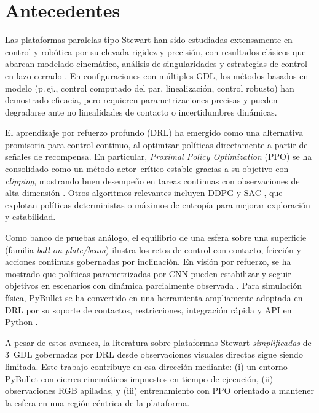 \documentclass[conference]{IEEEtran}
\begin{document}
\section{Antecedentes}
Las plataformas paralelas tipo Stewart han sido estudiadas extensamente en control y robótica por su elevada rigidez y precisión, con resultados clásicos que abarcan modelado cinemático, análisis de singularidades y estrategias de control en lazo cerrado \cite{Stewart1965,Merlet2006}. En configuraciones con múltiples GDL, los métodos basados en modelo (p.\,ej., control computado del par, linealización, control robusto) han demostrado eficacia, pero requieren parametrizaciones precisas y pueden degradarse ante no linealidades de contacto o incertidumbres dinámicas.

El aprendizaje por refuerzo profundo (DRL) ha emergido como una alternativa promisoria para control continuo, al optimizar políticas directamente a partir de señales de recompensa. En particular, \emph{Proximal Policy Optimization} (PPO) se ha consolidado como un método actor–crítico estable gracias a su objetivo con \emph{clipping}, mostrando buen desempeño en tareas continuas con observaciones de alta dimensión \cite{Schulman2017PPO}. Otros algoritmos relevantes incluyen DDPG \cite{Lillicrap2016DDPG} y SAC \cite{Haarnoja2018SAC}, que explotan políticas deterministas o máximos de entropía para mejorar exploración y estabilidad.

Como banco de pruebas análogo, el equilibrio de una esfera sobre una superficie (familia \emph{ball-on-plate/beam}) ilustra los retos de control con contacto, fricción y acciones continuas gobernadas por inclinación. En visión por refuerzo, se ha mostrado que políticas parametrizadas por CNN pueden estabilizar y seguir objetivos en escenarios con dinámica parcialmente observada \cite{Levine2016EndToEnd}. Para simulación física, PyBullet se ha convertido en una herramienta ampliamente adoptada en DRL por su soporte de contactos, restricciones, integración rápida y API en Python \cite{Coumans2016PyBullet}.

A pesar de estos avances, la literatura sobre plataformas Stewart \emph{simplificadas} de 3~GDL gobernadas por DRL desde observaciones visuales directas sigue siendo limitada. Este trabajo contribuye en esa dirección mediante: (i) un entorno PyBullet con cierres cinemáticos impuestos en tiempo de ejecución, (ii) observaciones RGB apiladas, y (iii) entrenamiento con PPO orientado a mantener la esfera en una región céntrica de la plataforma.
\end{document}
